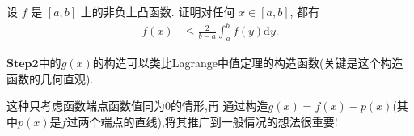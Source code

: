 \documentclass[../../main.tex]{subfiles}%
\begin{document}
\begin{proposition}\label{proposition:凸函数相关积分不等式11111}
设 $f$ 是 $[a,b]$ 上的非负上凸函数. 证明对任何 $x \in [a,b]$, 都有
\begin{align}\label{equation-凸性相关积分-16.40}
f(x) &\leqslant \frac{2}{b - a}\int_{a}^{b}f(y)\mathrm{d}y.
\end{align} 
\end{proposition}
\begin{remark}
$\mathbf{Step}\mathbf{2}$中的$g(x)$的构造可以类比Lagrange中值定理的构造函数(关键是这个构造函数的几何直观).
\end{remark}
\begin{note}
这种只考虑函数端点函数值同为0的情形,再
通过构造$g(x)=f(x)-p(x)$(其中$p(x)$是$f$过两个端点的直线),将其推广到一般情况的想法很重要!
\end{note}
\end{document}
